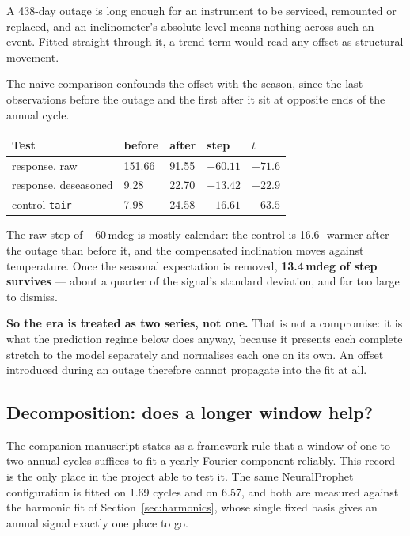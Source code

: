 \documentclass[11pt,a4paper]{article}
\begin{document}
A 438-day outage is long enough for an instrument to be serviced, remounted or
replaced, and an inclinometer's absolute level means nothing across such an
event. Fitted straight through it, a trend term would read any offset as
structural movement.

The naive comparison confounds the offset with the season, since the last
observations before the outage and the first after it sit at opposite ends of the
annual cycle.

\begin{center}
\small
\begin{tabular}{lR{2.0cm}R{2.0cm}R{1.8cm}R{1.4cm}}
\toprule
\textbf{Test} & \textbf{before} & \textbf{after} & \textbf{step} &
\textbf{$t$} \\
\midrule
response, raw        & 151.66 &  91.55 & $-60.11$ & $-71.6$ \\
response, deseasoned &   9.28 &  22.70 & $+13.42$ & $+22.9$ \\
control \texttt{tair} &  7.98 &  24.58 & $+16.61$ & $+63.5$ \\
\bottomrule
\end{tabular}
\end{center}


The raw step of $-60$\,mdeg is mostly calendar: the control is 16.6\,\degC\
warmer after the outage than before it, and the compensated inclination moves
against temperature. Once the seasonal expectation is removed, \textbf{13.4\,mdeg
of step survives} --- about a quarter of the signal's standard deviation, and far
too large to dismiss.

\textbf{So the era is treated as two series, not one.} That is not a compromise:
it is what the prediction regime below does anyway, because it presents each
complete stretch to the model separately and normalises each one on its own. An
offset introduced during an outage therefore cannot propagate into the fit at
all.

\subsection{Decomposition: does a longer window help?}

The companion manuscript states as a framework rule that a window of one to two
annual cycles suffices to fit a yearly Fourier component reliably. This record is
the only place in the project able to test it. The same NeuralProphet
configuration is fitted on 1.69 cycles and on 6.57, and both are measured against
the harmonic fit of Section~\ref{sec:harmonics}, whose single fixed basis gives
an annual signal exactly one place to go.
\end{document}

